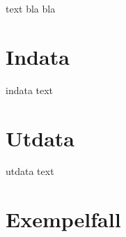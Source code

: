 
text bla bla


\section*{Indata}
indata text

\section*{Utdata}
utdata text

\section*{Exempelfall}
